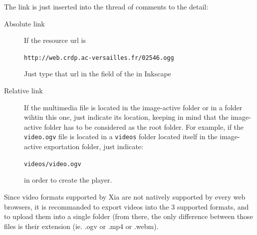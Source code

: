 The link is just inserted into the thread of comments to the detail:
\begin{description}
 \item[Absolute link] If the resource url is
 
 \verb|http://web.crdp.ac-versailles.fr/02546.ogg|
 
 Just type that url in the  field of the  in 
 Inkscape
 
 \item [Relative link] If the multimedia file is located in the image-active 
 folder or in a folder wihtin this one, just indicate its location, keeping in 
 mind that the image-active folder has to be considered as the root folder. 
 For example, if the \verb|video.ogv| file is located in a \verb|videos| 
 folder located itself in the image-active exportation folder, just indicate:
 
  \verb|videos/video.ogv|
 
  in order to create the player.
\end{description}

Since video formats supported by Xia are not natively supported by every web 
browsers, it is recommanded to export videos into the 3 supported formats, 
and to upload them into a single folder (from there, the only difference 
between those files is their extension (ie. .ogv or .mp4 or .webm).\\

